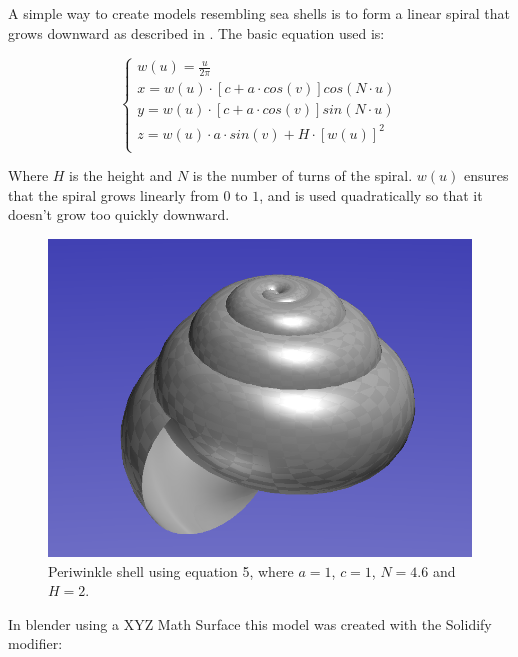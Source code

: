 \documentclass[a4paper]{article}
\begin{document}
A simple way to create models resembling sea shells is to form a linear spiral that grows downward as described in \cite{povray-seashells}. The basic equation used is:

\begin{equation}
	\begin{cases}
		w(u) = \frac{u}{2\pi}\\
		x = w(u) \cdot [c + a \cdot cos(v)] cos(N \cdot u)\\
		y = w(u) \cdot [c + a \cdot cos(v)] sin(N \cdot u)\\
		z = w(u) \cdot a \cdot sin(v) + H \cdot [w(u)]^2\\
	\end{cases}
\end{equation}

Where $H$ is the height and $N$ is the number of turns of the spiral. $w(u)$ ensures that the spiral grows linearly from $0$ to $1$, and is used quadratically so that it doesn't grow too quickly downward.

\begin{figure}[h]
	\centering\includegraphics[scale=0.3]{./img/ShellPeriwinkle.png}
	\caption{Periwinkle shell using equation 5, where $a = 1$, $c = 1$, $N = 4.6$ and $H = 2$. \cite{povray-seashells}}
	\label{periwinkle} %
\end{figure}

In blender using a XYZ Math Surface this model was created with the Solidify modifier:
\end{document}
